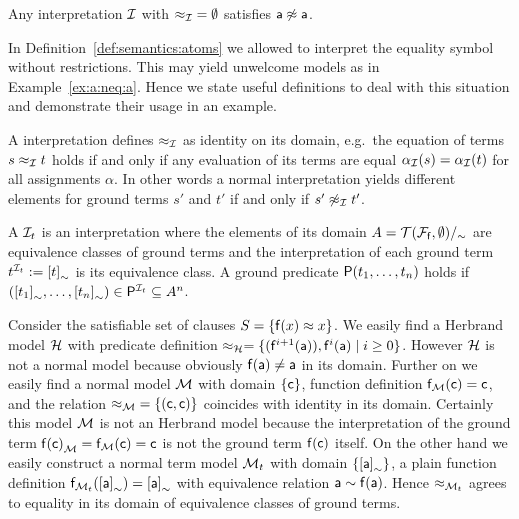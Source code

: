 \begin{example}\label{ex:a:neq:a}
	Any interpretation \( \mathcal{I} \)
	with \( {\approx_{\mathcal{I}}} = \emptyset \) satisfies \( \mathsf{a}\not\approx\mathsf{a} \).
\end{example}

\noindent In Definition~\vref{def:semantics:atoms} we allowed
to interpret the equality symbol without restrictions.
This may yield unwelcome models as in Example~\vref{ex:a:neq:a}.
Hence we state useful definitions to deal with this situation
and demonstrate their usage in an example.


\begin{definition}\label{def:normal:interpreation}
	A  interpretation defines \( \approx_{\mathcal{I}} \) as identity on its domain,
	e.g.~the equation of terms \( s \approx_{\mathcal{I}} t \) holds if and only
	if any evaluation of its terms are equal \( \alpha_{\mathcal{I}}(s) = \alpha_{\mathcal{I}}(t) \)
	for all assignments \( \alpha \).
	In other words a normal interpretation yields different elements
	for ground terms \( s' \) and \( t' \) if and only if \( s'\not\approx_{\mathcal{I}} t' \).
\end{definition}

\begin{definition}
	A 
	\( \mathcal{I}_t \)
	is an interpretation
	where the elements of its domain \( A = {\mathcal{T}(\mathcal{F}_{\mathsf{f}},\emptyset)}/_\sim \)
	are equivalence classes of ground terms
	and the interpretation of each ground term \( t^{\mathcal{I}_t} := {[t]}_\sim \) is its equivalence class.
	A ground predicate \( \mathsf{P}(t_1,\ldots,t_n) \) holds if
	\( ({[t_1]}_\sim,\ldots,{[t_n]}_\sim) \in \mathsf{P}^{\mathcal{I}_t} \subseteq A^n \).
\end{definition}


\begin{example}
	Consider the satisfiable set of clauses \( S = \{ \mathsf{f}(x) \approx x \} \).
	We easily find a Herbrand model \( \mathcal{H} \) with
	predicate definition
	\( \approx_{\mathcal{H}} = \{ (\mathsf{f}^{i+1}(\mathsf{a})), \mathsf{f}^{i}(\mathsf{a}) \mid i\geq 0  \}  \).
	However \( \mathcal{H} \) is not a normal model because obviously \( \mathsf{f}(\mathsf{a})\neq\mathsf{a} \) in its domain.
	Further on we easily find a normal model \( \mathcal{M} \)
	with domain \( \{ \mathsf{c} \} \), function definition \( \mathsf{f}_{\mathcal{M}}(\mathsf{c}) = \mathsf{c} \),
	and the relation \( {\approx_{\mathcal{M}}} = \{ (\mathsf{c},\mathsf{c})\} \) coincides with identity in its domain.
	Certainly this model \( \mathcal{M} \) is not an Herbrand model
	because the interpretation of the ground term \( {\mathsf{f}(\mathsf{c})}_{\mathcal{M}} = \mathsf{f}_{\mathcal{M}}(\mathsf{c})=\mathsf{c} \) is not the ground term \( \mathsf{f}(\mathsf{c}) \) itself.
	On the other hand we easily construct a normal term model
	\( \mathcal{M}_t \) with domain \( \{ {[\mathsf{a}]}_\sim \} \),
	a plain function definition
	\( \mathsf{f}_{\mathcal{M}_t}({[\mathsf{a}]}_\sim) = {[\mathsf{a}]}_\sim \)
	with equivalence relation
	\( \mathsf{a} \sim \mathsf{f}(\mathsf{a}) \).
	Hence \( \approx_{\mathcal{M}_t} \) agrees to equality in its domain of equivalence classes of ground terms.
\end{example}

